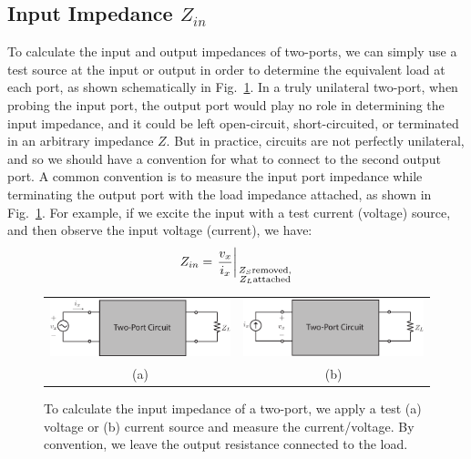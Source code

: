 \subsection{Input Impedance \texorpdfstring{$Z_{in}$}{}}
To calculate the input and output impedances of two-ports, we can simply use a test source at the input or output  in order to determine the equivalent load at each port, as shown schematically in Fig.~\ref{fig:2port_zin_vx}.  In a truly unilateral two-port, when probing the input port, the output port would play no role in determining the input impedance, and it could be left open-circuit, short-circuited, or terminated in an arbitrary impedance $Z$.  But in practice, circuits are not perfectly unilateral, and so we should have a convention for what to connect to the second output port.
A common convention is to measure the input port impedance while terminating the output port with the load impedance attached, as shown in Fig.~\ref{fig:2port_zin_vx}.  For example, if we excite the input with a test current (voltage) source, and then observe the input voltage (current), we have:
    \begin{equation}
        {Z_{in}} = {\left. \frac{v_x}{i_x}\right|_{\genfrac{}{}{0pt}{2}
            {\scriptstyle{Z_S}\text{removed},}
            {\scriptstyle{Z_L}\text{attached}}}}
    \end{equation}
\begin{figure}[tb]
\centering
\begin{tabular}{cc}
\includegraphics[width=.45\columnwidth]{2port_zin_vx} &
\includegraphics[width=.45\columnwidth]{2port_zin_ix}\\
(a) & (b)\\
\end{tabular}
\caption{To calculate the input impedance of a two-port, we apply a test (a) voltage or (b) current source and measure the current/voltage.  By convention, we leave the output resistance connected to the load.}
\label{fig:2port_zin_vx}
\end{figure}
